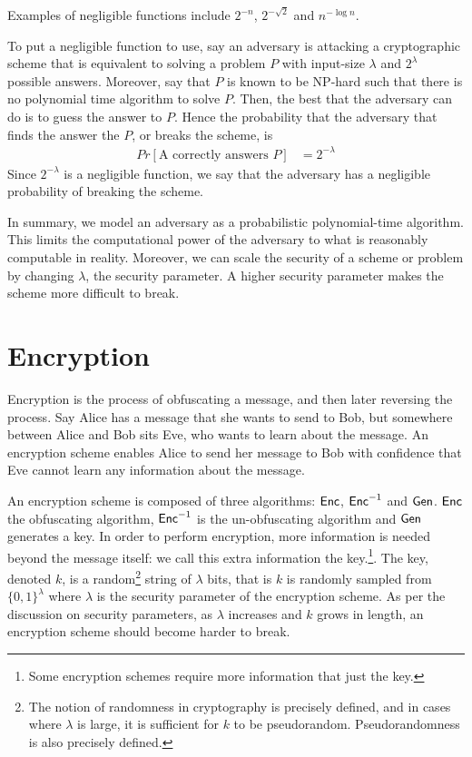 Examples of negligible functions include $2^{-n}$, $2^{- \sqrt{2}}$ and $n^{- \log n}$. 

To put a negligible function to use, say an adversary is attacking a cryptographic scheme that is equivalent to solving a problem $P$ with input-size $\lambda$ and $2^{\lambda}$ possible answers. 
Moreover, say that $P$ is known to be NP-hard such that there is no polynomial time algorithm to solve $P$. 
Then, the best that the adversary can do is to guess the answer to $P$.
Hence the probability that the adversary that finds the answer the $P$, or breaks the scheme, is 
\begin{align*}
Pr[\text{A correctly answers $P$}] & = {2^{- \lambda}}
\end{align*}
Since $2^{- \lambda}$ is a negligible function, we say that the adversary has a negligible probability of breaking the scheme. 

In summary, we model an adversary as a probabilistic polynomial-time algorithm. 
This limits the computational power of the adversary to what is reasonably computable in reality. 
Moreover, we can scale the security of a scheme or problem by changing $\lambda$, the security parameter. 
A higher security parameter makes the scheme more difficult to break. 

\section{Encryption}

Encryption is the process of obfuscating a message, and then later reversing the process. 
Say Alice has a message that she wants to send to Bob, but somewhere between Alice and Bob sits Eve, who wants to learn about the message.
An encryption scheme enables Alice to send her message to Bob with confidence that Eve cannot learn any information about the message. 

An encryption scheme is composed of three algorithms: $\textsf{Enc}$, $\textsf{Enc}^{-1}$ and $\textsf{Gen}$. 
$\textsf{Enc}$ the obfuscating algorithm, $\textsf{Enc}^{-1}$ is the un-obfuscating algorithm and $\textsf{Gen}$ generates a key. 
In order to perform encryption, more information is needed beyond the message itself: we call this extra information the key.\footnote{Some encryption schemes require more information that just the key.}.
The key, denoted $k$, is a random\footnote{The notion of randomness in cryptography is precisely defined, and in cases where $\lambda$ is large, it is sufficient for $k$ to be pseudorandom. Pseudorandomness is also precisely defined.} string of $\lambda$ bits, that is $k$ is randomly sampled from $\{0,1\}^{\lambda}$  where $\lambda$ is the security parameter of the encryption scheme. 
As per the discussion on security parameters, as $\lambda$ increases and $k$ grows in length, an encryption scheme should become harder to break.

